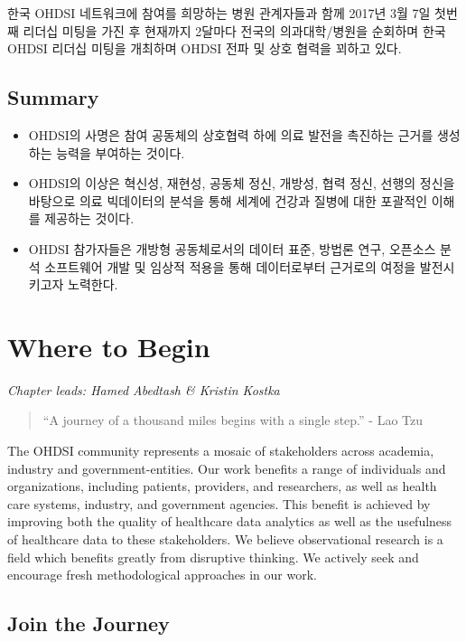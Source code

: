 \documentclass[11pt]{book}
\theoremstyle{definition}
\theoremstyle{definition}
\theoremstyle{definition}
\theoremstyle{remark}
\let\BeginKnitrBlock\begin \let\EndKnitrBlock\end
\begin{document}
한국 OHDSI 네트워크에 참여를 희망하는 병원 관계자들과 함께 2017년 3월
7일 첫번째 리더십 미팅을 가진 후 현재까지 2달마다 전국의 의과대학/병원을
순회하며 한국 OHDSI 리더십 미팅을 개최하며 OHDSI 전파 및 상호 협력을
꾀하고 있다.

\section{Summary}\label{summary}

\BeginKnitrBlock{rmdsummary}
\begin{itemize}
\item
  OHDSI의 사명은 참여 공동체의 상호협력 하에 의료 발전을 촉진하는 근거를
  생성하는 능력을 부여하는 것이다.
\item
  OHDSI의 이상은 혁신성, 재현성, 공동체 정신, 개방성, 협력 정신, 선행의
  정신을 바탕으로 의료 빅데이터의 분석을 통해 세계에 건강과 질병에 대한
  포괄적인 이해를 제공하는 것이다.
\item
  OHDSI 참가자들은 개방형 공동체로서의 데이터 표준, 방법론 연구,
  오픈소스 분석 소프트웨어 개발 및 임상적 적용을 통해 데이터로부터
  근거로의 여정을 발전시키고자 노력한다.
\end{itemize}
\EndKnitrBlock{rmdsummary}

\chapter{Where to Begin}\label{WhereToBegin}

\emph{Chapter leads: Hamed Abedtash \& Kristin Kostka}

\begin{quote}
``A journey of a thousand miles begins with a single step.'' - Lao Tzu
\end{quote}

The OHDSI community represents a mosaic of stakeholders across academia,
industry and government-entities. Our work benefits a range of
individuals and organizations, including patients, providers, and
researchers, as well as health care systems, industry, and government
agencies. This benefit is achieved by improving both the quality of
healthcare data analytics as well as the usefulness of healthcare data
to these stakeholders. We believe observational research is a field
which benefits greatly from disruptive thinking. We actively seek and
encourage fresh methodological approaches in our work. 

\section{Join the Journey}\label{join-the-journey}
\end{document}
